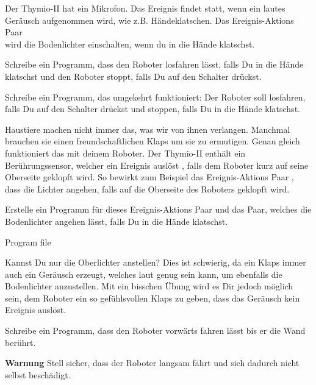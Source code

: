 
Der Thymio-II hat ein Mikrofon.
Das Ereignis  findet statt,
wenn ein lautes Geräusch aufgenommen wird, wie z.B. Händeklatschen.
Das Ereignis-Aktions Paar \\  wird die Bodenlichter einschalten,
wenn du in die Hände klatschst.



Schreibe ein Programm,
dass den Roboter losfahren lässt,
falls Du in die Hände klatschst und den Roboter stoppt,
falls Du auf den Schalter drückst.

Schreibe ein Programm, das umgekehrt funktioniert:
Der Roboter soll losfahren,
falls Du auf den Schalter drückst und stoppen,
falls Du in die Hände klatschst.


Haustiere machen nicht immer das,
was wir von ihnen verlangen.
Manchmal brauchen sie einen freundschaftlichen Klaps um sie zu ermutigen.
Genau gleich funktioniert das mit deinem Roboter.
Der Thymio-II enthält ein Berührungssensor, welcher ein Ereignis auslöst , falls dem Roboter kurz auf seine Oberseite geklopft wird. So bewirkt zum Beispiel das Ereignis-Aktions Paar , dass die Lichter angehen, falls auf die Oberseite des Roboters geklopft wird.

Erstelle ein Programm für dieses Ereignis-Aktions Paar
und das Paar, welches die Bodenlichter angehen lässt,
falls Du in die Hände klatschst.

{\raggedleft \hfill Program file }

Kannst Du nur die Oberlichter anstellen?
Dies ist schwierig, da ein Klaps immer auch ein Geräusch erzeugt,
welches laut genug sein kann, um ebenfalls die Bodenlichter anzustellen.
Mit ein bisschen Übung wird es Dir jedoch möglich sein,
dem Roboter ein so gefühlsvollen Klaps zu geben,
dass das Geräusch kein Ereignis auslöst.


Schreibe ein Programm, dass den Roboter vorwärts fahren lässt bis er die Wand berührt. 

\textbf{Warnung} Stell sicher, dass der Roboter langsam fährt und sich dadurch nicht selbst beschädigt.
